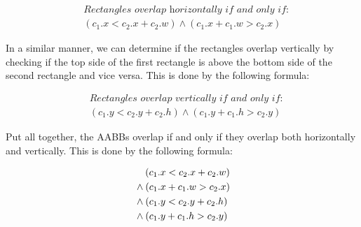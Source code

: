 \begin{equation}
    \begin{aligned}
         & \textit{Rectangles overlap horizontally if and only if:} \\
         & (c_1.x < c_2.x + c_2.w) \land (c_1.x + c_1.w > c_2.x)
    \end{aligned}
\end{equation}

In a similar manner, we can determine if the rectangles overlap vertically by
checking if the top side of the first rectangle is above the bottom side of the
second rectangle and vice versa. This is done by the following formula:

\begin{equation}
    \begin{aligned}
         & \textit{Rectangles overlap vertically if and only if:} \\
         & (c_1.y < c_2.y + c_2.h) \land (c_1.y + c_1.h > c_2.y)
    \end{aligned}
\end{equation}

Put all together, the AABBs overlap if and only if they overlap both
horizontally and vertically. This is done by the following formula:

\begin{equation}
    \begin{aligned}
         & \hspace{1.1em} (c_1.x < c_2.x + c_2.w) \\
         & \land (c_1.x + c_1.w > c_2.x)          \\
         & \land (c_1.y < c_2.y + c_2.h)          \\
         & \land (c_1.y + c_1.h > c_2.y)
    \end{aligned}
\end{equation}

